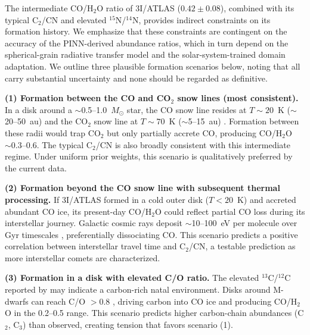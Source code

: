 \documentclass[preprint2]{aastex631}
\begin{document}
The intermediate CO/H$_2$O ratio of 3I/ATLAS ($0.42 \pm 0.08$), combined with its typical C$_2$/CN and elevated $^{15}$N/$^{14}$N, provides indirect constraints on its formation history. We emphasize that these constraints are contingent on the accuracy of the PINN-derived abundance ratios, which in turn depend on the spherical-grain radiative transfer model and the solar-system-trained domain adaptation. We outline three plausible formation scenarios below, noting that all carry substantial uncertainty and none should be regarded as definitive.

\textbf{(1) Formation between the CO and CO$_2$ snow lines (most consistent).} In a disk around a $\sim$0.5--1.0~$M_\odot$ star, the CO snow line resides at $T \sim 20$~K ($\sim$20--50~au) and the CO$_2$ snow line at $T \sim 70$~K ($\sim$5--15~au) \citep{qi15}. Formation between these radii would trap CO$_2$ but only partially accrete CO, producing CO/H$_2$O $\sim 0.3$--0.6. The typical C$_2$/CN is also broadly consistent with this intermediate regime. Under uniform prior weights, this scenario is qualitatively preferred by the current data.

\textbf{(2) Formation beyond the CO snow line with subsequent thermal processing.} If 3I/ATLAS formed in a cold outer disk ($T < 20$~K) and accreted abundant CO ice, its present-day CO/H$_2$O could reflect partial CO loss during its interstellar journey. Galactic cosmic rays deposit $\sim$10--100~eV per molecule over Gyr timescales \citep{gerakines01}, preferentially dissociating CO. This scenario predicts a positive correlation between interstellar travel time and C$_2$/CN, a testable prediction as more interstellar comets are characterized.

\textbf{(3) Formation in a disk with elevated C/O ratio.} The elevated $^{13}$C/$^{12}$C reported by \citet{opitom26} may indicate a carbon-rich natal environment. Disks around M-dwarfs can reach C/O $> 0.8$ \citep{bergin14}, driving carbon into CO ice and producing CO/H$_2$O in the 0.2--0.5 range. This scenario predicts higher carbon-chain abundances (C$_2$, C$_3$) than observed, creating tension that favors scenario (1).
\end{document}
